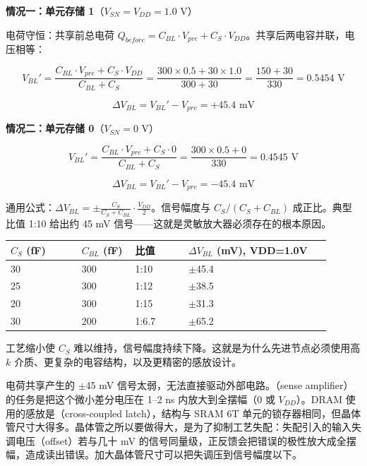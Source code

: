 \textbf{情况一：单元存储 1}（$V_{SN} = V_{DD} = 1.0$ V）

电荷守恒：共享前总电荷 $Q_{before} = C_{BL} \cdot V_{pre} + C_S \cdot V_{DD}$。共享后两电容并联，电压相等：

$$V_{BL}' = \frac{C_{BL} \cdot V_{pre} + C_S \cdot V_{DD}}{C_{BL} + C_S} = \frac{300 \times 0.5 + 30 \times 1.0}{300 + 30} = \frac{150 + 30}{330} = 0.5454 \text{ V}$$

$$\Delta V_{BL} = V_{BL}' - V_{pre} = +45.4 \text{ mV}$$

\textbf{情况二：单元存储 0}（$V_{SN} = 0$ V）

$$V_{BL}' = \frac{C_{BL} \cdot V_{pre} + C_S \cdot 0}{C_{BL} + C_S} = \frac{300 \times 0.5 + 0}{330} = 0.4545 \text{ V}$$

$$\Delta V_{BL} = V_{BL}' - V_{pre} = -45.4 \text{ mV}$$

\begin{keyidea}
通用公式：$\Delta V_{BL} = \pm\frac{C_S}{C_S + C_{BL}} \cdot \frac{V_{DD}}{2}$。信号幅度与 $C_S/(C_S+C_{BL})$ 成正比。典型比值 1:10 给出约 45 mV 信号——这就是灵敏放大器必须存在的根本原因。
\end{keyidea}

\begin{longtable}{L{0.2\linewidth}L{0.15\linewidth}L{0.15\linewidth}L{0.4\linewidth}}
\toprule
$C_S$ (fF) & $C_{BL}$ (fF) & 比值 & $\Delta V_{BL}$ (mV), VDD=1.0V \\
 & 300 & 1:10 & $\pm$45.4 \\
25 & 300 & 1:12 & $\pm$38.5 \\
20 & 300 & 1:15 & $\pm$31.3 \\
30 & 200 & 1:6.7 & $\pm$65.2 \\
\bottomrule
\end{longtable}

工艺缩小使 $C_S$ 难以维持，信号幅度持续下降。这就是为什么先进节点必须使用高 $k$ 介质、更复杂的电容结构，以及更精密的感放设计。


电荷共享产生的 $\pm$45 mV 信号太弱，无法直接驱动外部电路。（sense amplifier）的任务是把这个微小差分电压在 1--2 ns 内放大到全摆幅（0 或 $V_{DD}$）。DRAM 使用的感放是（cross-coupled latch），结构与 SRAM 6T 单元的锁存器相同，但晶体管尺寸大得多。晶体管之所以要做得大，是为了抑制工艺失配：失配引入的输入失调电压（offset）若与几十 mV 的信号同量级，正反馈会把错误的极性放大成全摆幅，造成读出错误。加大晶体管尺寸可以把失调压到信号幅度以下。

